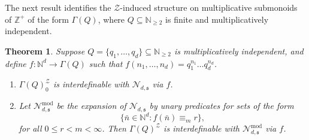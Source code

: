 \documentclass{amsart}
\def\seq{\subseteq}
\newcommand{\nbar}{\bar{n}}
\newcommand{\ms}{\mathfrak{s}}
\def\mod{\operatorname{mod}}
\newcommand{\cN}{\mathcal{N}}
\newcommand{\cZ}{\mathcal{Z}}
\def\N{\mathbb N}
\def\Z{\mathbb Z}
\newtheorem{theorem}{Theorem}[section]
\theoremstyle{definition}
\begin{document}
The next result identifies the $\cZ$-induced structure on multiplicative submonoids of $\Z^+$ of the form $\Gamma(Q)$, where $Q\seq\N_{\geq 2}$ is finite and multiplicatively independent. 

\begin{theorem}\label{thm:FG0}
Suppose $Q=\{q_1,\ldots,q_d\}\seq\N_{\geq 2}$ is multiplicatively independent, and define $f:\N^d\to \Gamma(Q)$ such that $f(n_1,\ldots,n_d)=q_1^{n_1}\ldots q_d^{n_d}$.
\begin{enumerate}[$(a)$]
\item $\Gamma(Q)_0^{\cZ}$ is interdefinable with $\cN_{d,\ms}$ via $f$.
\item  Let $\cN^{\mod}_{d,\ms}$ be the expansion of $\cN_{d,\ms}$ by unary predicates for sets of the form
\[
\{\nbar\in\N^d:f(\nbar)\equiv_m r\},
\]
 for all $0\leq r<m<\infty$. Then $\Gamma(Q)^{\cZ}$ is interdefinable with $\cN^{\mod}_{d,\ms}$ via $f$. 
 \end{enumerate}
\end{theorem}
\end{document}
